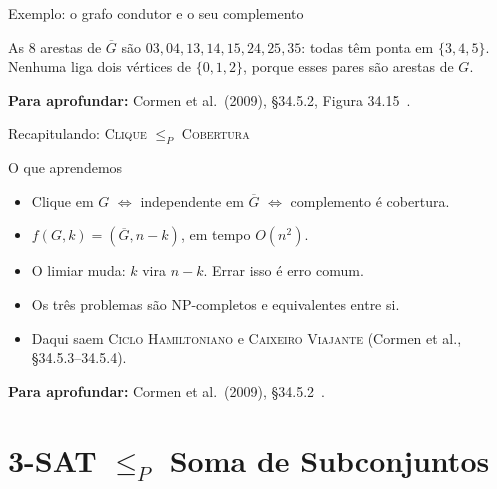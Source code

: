 \documentclass[aspectratio=169,xcolor=table]{beamer}
\newcommand{\arestashexa}{0/1, 1/2, 2/3, 3/4, 4/5, 5/0, 0/2}
\newcommand{\arestascomp}{0/3, 0/4, 1/3, 1/4, 1/5, 2/4, 2/5, 3/5}
\newcommand{\noshexa}{%
  \foreach \i in {0,...,5} \node[vert] (h\i) at ({90+60*\i}:0.95) {\i};
}
\newcommand{\grafohexa}[3]{%
  \noshexa
  \def\listaA{#3}\ifx\listaA\empty\else
    \foreach \u/\v in {#3} \draw[ares] (h\u) -- (h\v);\fi
  \foreach \u/\v in #1 \draw[aresta] (h\u) -- (h\v);
  \def\listaV{#2}\ifx\listaV\empty\else
    \foreach \v in {#2} \node[vS] at (h\v) {\v};\fi
}
\newcommand{\fonte}[1]{%
  \vfill
  {\tiny\color{gray!55!black}\textbf{Para aprofundar:} #1\par}%
}
\newcommand{\prob}[1]{\textsc{#1}}
\begin{document}
\begin{frame}{Exemplo: o grafo condutor e o seu complemento}
  \begin{center}
  \end{center}
  \scriptsize
  As $8$ arestas de $\overline{G}$ são $03, 04, 13, 14, 15, 24, 25, 35$: todas têm ponta em
  $\{3,4,5\}$. Nenhuma liga dois vértices de $\{0,1,2\}$, porque esses pares são arestas de
  $G$.
  \fonte{Cormen et al.\ (2009), \S 34.5.2, Figura 34.15~\cite{cormen2009introduction}.}
\end{frame}

\begin{frame}{Recapitulando: \prob{Clique} $\le_P$ \prob{Cobertura}}
  \begin{block}{O que aprendemos}
    \begin{itemize}
      \item Clique em $G$ $\iff$ independente em $\overline{G}$ $\iff$ complemento é cobertura.
      \item $f(G, k) = (\overline{G}, n - k)$, em tempo $O(n^2)$.
      \item O limiar muda: $k$ vira $n - k$. Errar isso é erro comum.
      \item Os três problemas são NP-completos e equivalentes entre si.
      \item Daqui saem \prob{Ciclo Hamiltoniano} e \prob{Caixeiro Viajante} (Cormen et al., \S 34.5.3--34.5.4).
    \end{itemize}
  \end{block}
  \fonte{Cormen et al.\ (2009), \S 34.5.2~\cite{cormen2009introduction}.}
\end{frame}

\section{3-SAT $\le_P$ Soma de Subconjuntos}
\end{document}
